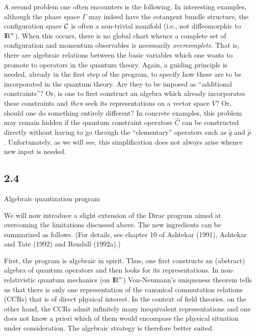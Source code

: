 A second problem one often encounters is the following. In interesting
examples, although the phase space $\Gamma$ may indeed have the cotangent
bundle structure, the configuration space ${\cal C}$ is often a non-trivial
manifold (i.e., not diffeomorphic to ${\rm I\!R}^n$). When this occurs, there is
no global chart whence a complete set of configuration and momentum
observables is necessarily {\it overcomplete}. That is, there are algebraic
relations between the basic variables which one wants to promote to operators
in the quantum theory. Again, a guiding principle is needed, already in the
first step of the program, to specify how these are to be incorporated in
the quantum theory. Are they to be imposed as ``additional constraints''?
Or, is one to first construct an algebra which already incorporates
these constraints and {\it then} seek its representations on a vector
space $V$? Or, should one do something entirely different? In concrete
examples, this problem may remain hidden if the quantum constraint
operators $\hat{C}$ can be constructed directly without having to go through
the ``elementary'' operators such as $\hat{q}$ and $\hat{p}$. Unfortunately,
as we will see, this simplification does not always arise whence new input
is needed.

\goodbreak
\subsection{2.4}{Algebraic quantization program}

We will now introduce a slight extension of the Dirac program aimed at
overcoming the limitations discussed above. The new ingredients can be
summarized as follows. (For details, see chapter 10 of Ashtekar (1991),
Ashtekar and Tate (1992) and Rendall (1992a).)

First, the program is algebraic in spirit. Thus, one first constructs
an (abstract) algebra of quantum operators and then looks for its
representations. In non-relativistic quantum mechanics (on ${\rm I\!R}^n$)
Von-Neumann's uniqueness theorem tells us that there is only one
representation of the canonical commutation relations (CCRs) that is of
direct physical interest. In the context of field theories, on the other
hand, the CCRs admit infinitely many inequivalent representations and one
does not know a priori which of them would encompass the physical situation
under consideration. The algebraic strategy is therefore better suited.

